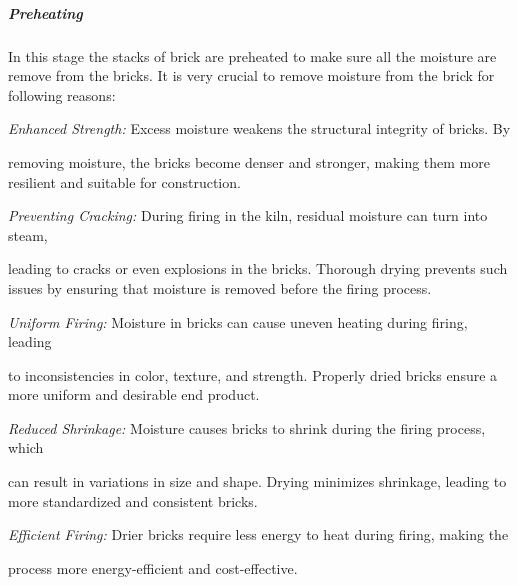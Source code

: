 \subparagraph{Preheating}
\begin{adjustwidth}{1.5em}{0em}
In this stage the stacks of brick are preheated to make sure all the moisture are remove from the bricks. It is very crucial to remove moisture from the brick for following reasons:

\vspace{0.1cm}
\textit{Enhanced Strength:}
 Excess moisture weakens the structural integrity of bricks. By \begin{adjustwidth}{1.5em}{0em}removing moisture, the bricks become denser and stronger, making them more resilient and suitable for construction.
 \vspace{0.1cm}
\end{adjustwidth}

\textit{Preventing Cracking:}
 During firing in the kiln, residual moisture can turn into steam, \begin{adjustwidth}{1.5em}{0em}leading to cracks or even explosions in the bricks. Thorough drying prevents such issues by ensuring that moisture is removed before the firing process.
\vspace{0.1cm}
\end{adjustwidth}

\textit{Uniform Firing:}
 Moisture in bricks can cause uneven heating during firing, leading \begin{adjustwidth}{1.5em}{0em}to inconsistencies in color, texture, and strength. Properly dried bricks ensure a more uniform and desirable end product.
 \vspace{0.1cm}
\end{adjustwidth}

\textit{Reduced Shrinkage:}
 Moisture causes bricks to shrink during the firing process, which \begin{adjustwidth}{1.5em}{0em}can result in variations in size and shape. Drying minimizes shrinkage, leading to more standardized and consistent bricks.
\vspace{0.1cm}
\end{adjustwidth}

\textit{Efficient Firing:} Drier bricks require less energy to heat during firing, making the \begin{adjustwidth}{1.5em}{0em}process more energy-efficient and cost-effective.
\vspace{0.1cm}
\end{adjustwidth}
\end{adjustwidth}
\vspace{0.1cm}

